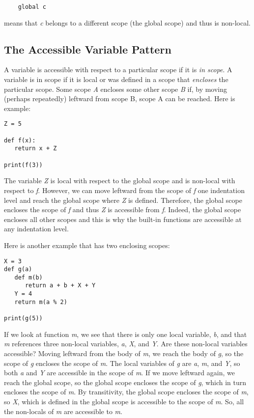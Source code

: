 \begin{verbatim}
    global c
\end{verbatim}

means that {\it c} belongs to a different scope (the global scope) and thus
is non-local.

\subsection{The Accessible Variable Pattern}

A variable is accessible with respect to
a particular scope if it is {\it in scope}.
A variable is in scope if it is local or
was defined in a scope that
{\it encloses} the particular scope.
Some scope
{\it A} encloses some other scope {\it B}
if, by moving (perhaps repeatedly) leftward from
scope B, scope A can be reached.
Here is example:

\begin{verbatim}
Z = 5

def f(x):
   return x + Z

print(f(3))
\end{verbatim}

The variable {\it Z} is local with respect to the global scope
and is non-local with respect to {\it f}. However, we can
move leftward from the scope of {\it f} one indentation level and
reach the global scope where {\it Z} is defined.
Therefore, the global scope encloses the scope of {\it f} and
thus {\it Z} is accessible from {\it f}.
Indeed, the global scope encloses all other scopes and this
is why the built-in functions are accessible at any indentation
level.

Here is another example that has two enclosing scopes:

\begin{verbatim}
X = 3
def g(a)
   def m(b)
      return a + b + X + Y
   Y = 4
   return m(a % 2)

print(g(5))
\end{verbatim}

If we look at function {\it m}, we see that there is only
one local variable, {\it b}, and that {\it m} references three
non-local variables,
{\it a}, {\it X}, and {\it Y}. 
Are these non-local variables accessible?
Moving leftward from the body of {\it m}, we reach the body of {\it g},
so the scope of {\it g} encloses the scope of {\it m}. The local variables
of {\it g} are {\it a}, {\it m}, and {\it Y}, so both {\it a} and {\it Y}
are accessible in the scope of {\it m}.
If we move leftward again, we reach the global scope,
so the global scope encloses the scope of {\it g}, which in turn encloses
the scope of {\it m}. By transitivity, the global scope encloses
the scope of {\it m}, so {\it X}, which is defined in the global scope
is accessible to the scope of {\it m}.
So, all the non-locals of {\it m} are accessible to {\it m}.

